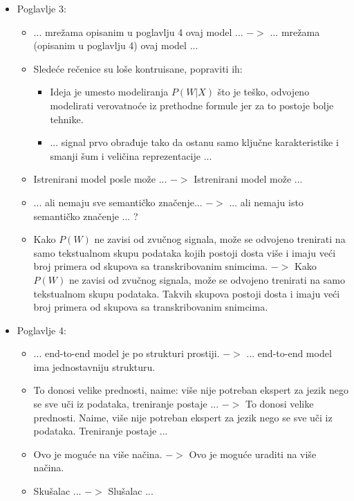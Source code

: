 \documentclass[a4paper]{report}
\begin{document}
\begin{itemize}
  \item Poglavlje 3:
  \begin{itemize}
  \item ... mrežama opisanim u poglavlju 4 ovaj model ... $->$  ... mrežama (opisanim u poglavlju 4) ovaj model ...
  \item Sledeće rečenice su loše kontruisane, popraviti ih:
  \begin{itemize}
      \item Ideja je umesto modeliranja $P(W|X)$ što je teško, odvojeno modelirati verovatnoće iz prethodne formule jer za to postoje bolje tehnike.
      \item ... signal prvo obrađuje tako da ostanu samo ključne karakteristike i smanji šum i veličina reprezentacije ... 
  \end{itemize}
  \item Istrenirani model posle može ... $->$ Istrenirani model može ...
  \item ... ali nemaju sve semantičko značenje... $->$ ... ali nemaju isto semantičko značenje ... ?
  \item Kako $P(W)$ ne zavisi od zvučnog signala, može se odvojeno trenirati na samo tekstualnom skupu podataka kojih postoji dosta više i imaju veći broj primera od skupova sa transkribovanim snimcima. $->$
Kako $P(W)$ ne zavisi od zvučnog signala, može se odvojeno trenirati na samo tekstualnom skupu podataka. Takvih skupova postoji dosta i imaju veći broj primera od skupova sa transkribovanim snimcima. 
 \end{itemize}
\end{itemize}

\begin{itemize}
    \item Poglavlje 4:
    \begin{itemize}
        \item ... end-to-end model je po strukturi prostiji. $->$ ... end-to-end model ima jednostavniju strukturu.
        \item To donosi velike prednosti, naime: više nije potreban ekspert za jezik nego se sve uči iz podataka, treniranje postaje ... $->$ 
        To donosi velike prednosti. Naime, više nije potreban ekspert za jezik nego se sve uči iz podataka. Treniranje postaje ...
        \item Ovo je moguće na više načina. $->$ Ovo je moguće uraditi na više načina.
        \item Skušalac ... $->$ Slušalac ...
    \end{itemize}
\end{itemize}
  
\end{document}
